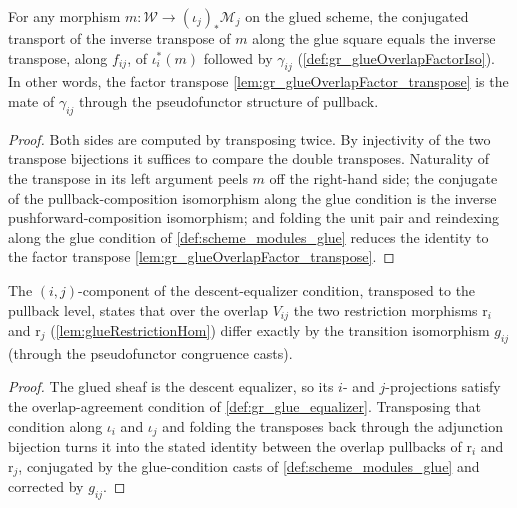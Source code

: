 \begin{lemma}
  \label{lem:gr_glueOverlapFactor_mate}
  For any morphism \(m : \mathcal{W} \to (\iota_j)_{*}\mathcal{M}_j\) on the glued
  scheme, the conjugated transport of the inverse transpose of \(m\) along the glue
  square equals the inverse transpose, along \(f_{ij}\), of \(\iota_i^{*}(m)\) followed
  by \(\gamma_{ij}\) (\cref{def:gr_glueOverlapFactorIso}). In other words, the factor
  transpose \cref{lem:gr_glueOverlapFactor_transpose} is the mate of \(\gamma_{ij}\)
  through the pseudofunctor structure of pullback.
\end{lemma}
\begin{proof}
    \leanok
  Both sides are computed by transposing twice. By injectivity of the two transpose
  bijections it suffices to compare the double transposes. Naturality of the transpose
  in its left argument peels \(m\) off the right-hand side; the conjugate of the
  pullback-composition isomorphism along the glue condition is the inverse
  pushforward-composition isomorphism; and folding the unit pair and reindexing along
  the glue condition of \cref{def:scheme_modules_glue} reduces the identity to the
  factor transpose \cref{lem:gr_glueOverlapFactor_transpose}.
\end{proof}

\begin{lemma}
  \label{lem:gr_glueRestriction_overlap_compat}
  The \((i,j)\)-component of the descent-equalizer condition, transposed to the
  pullback level, states that over the overlap \(V_{ij}\) the two restriction
  morphisms \(\mathrm{r}_i\) and \(\mathrm{r}_j\) (\cref{lem:glueRestrictionHom}) differ
  exactly by the transition isomorphism \(g_{ij}\) (through the pseudofunctor
  congruence casts).
\end{lemma}
\begin{proof}
  \leanok
  The glued sheaf is the descent equalizer, so its \(i\)- and \(j\)-projections satisfy
  the overlap-agreement condition of \cref{def:gr_glue_equalizer}. Transposing that
  condition along \(\iota_i\) and \(\iota_j\) and folding the transposes back through
  the adjunction bijection turns it into the stated identity between the overlap
  pullbacks of \(\mathrm{r}_i\) and \(\mathrm{r}_j\), conjugated by the glue-condition
  casts of \cref{def:scheme_modules_glue} and corrected by \(g_{ij}\).
\end{proof}

